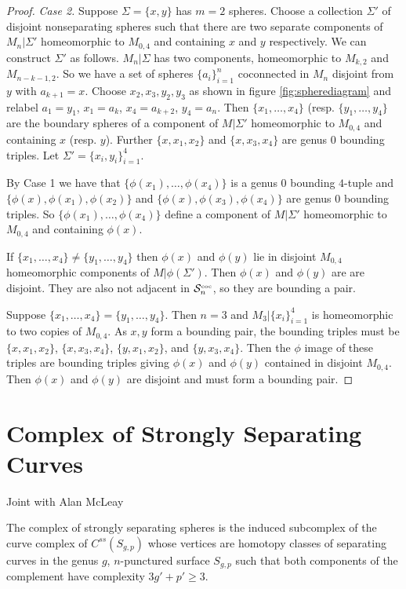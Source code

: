 \documentclass[11pt]{article}
\newcommand{\coc}[1]{{\ensuremath{ \mathcal S^{\mbox{\tiny{coc}}}_{#1} }}}
\theoremstyle{remark}
\theoremstyle{definition}
\begin{document}
\begin{proof}
\medskip \noindent \emph{Case 2.} Suppose $\Sigma=\{x,y\}$ has $m=2$ spheres.
Choose a collection $\Sigma'$ of disjoint nonseparating spheres such that  there are two separate components of $M_n|\Sigma'$ homeomorphic to $M_{0,4}$ and containing $x$ and $y$ respectively.
We can construct $\Sigma'$ as follows.
$M_n|\Sigma$ has two components, homeomorphic to $M_{k,2}$ and $M_{n-k-1,2}$.
So we have a set of spheres $\{a_i\}_{i=1}^n$ coconnected in $M_n$ disjoint from $y$ with $a_{k+1}=x$.
Choose $x_2,x_3,y_2,y_3$ as shown in figure \ref{fig:spherediagram} and relabel $a_1=y_1$, $x_{1}=a_k$, $x_4=a_{k+2}$, $y_4=a_n$.
Then
$\{x_1,\ldots, x_4\}$ (resp. $\{y_1, \ldots, y_4\}$ are the boundary spheres of a component of $M|\Sigma'$ homeomorphic to $M_{0,4}$ and containing $x$ (resp. $y$).
Further $\{x,x_1,x_2\}$ and $\{x,x_3,x_4\}$ are genus 0 bounding triples. Let $\Sigma' =\{x_i,y_i\}_{i=1}^4$.



By Case 1 we have that $\{\phi(x_1), \ldots, \phi(x_4)\}$ is a genus 0 bounding $4$-tuple and $\{\phi(x),\phi(x_1),\phi(x_2)\}$ and $\{\phi(x),\phi(x_3),\phi(x_4)\}$ are genus 0 bounding triples.
So $\{\phi(x_1), \ldots, \phi(x_4)\}$ define a component of $M|\Sigma'$ homeomorphic to $M_{0,4}$ and containing $\phi(x)$.

If $\{x_1, \ldots, x_4\} \neq \{y_1, \ldots, y_4\}$ then
 $\phi(x)$ and $\phi(y)$ lie in disjoint $M_{0,4}$ homeomorphic components of $M|\phi(\Sigma')$.
Then  $\phi(x)$ and $\phi(y)$ are are disjoint. They are also not adjacent in $\coc n$, so they are bounding a pair.

Suppose $\{x_1, \ldots, x_4\} = \{y_1, \ldots, y_4\}$.
Then $n=3$ and $M_3|\{x_i\}_{i=1}^4$ is homeomorphic to two copies of $M_{0,4}$.
As $x,y$ form a bounding pair, the bounding triples must be
$\{x,x_1,x_2\}$, $\{x,x_3,x_4\}$, $\{y,x_1,x_2\}$, and $\{y,x_3,x_4\}$.
Then the $\phi$ image of these triples are
bounding triples giving $\phi(x)$ and $\phi(y)$ contained in disjoint $M_{0,4}$.
Then $\phi(x)$ and $\phi(y)$ are disjoint and must form a bounding pair.
\end{proof}



\newpage
\section{Complex of Strongly Separating Curves}

Joint with Alan McLeay

The complex of strongly separating spheres is the induced subcomplex
of the curve complex of $C^{ss}(S_{g,p})$
whose vertices are homotopy classes of
separating curves in the genus $g$, $n$-punctured surface $S_{g,p}$
such that both components of the complement have complexity $3g'+p'\geq 3$.
\end{document}
